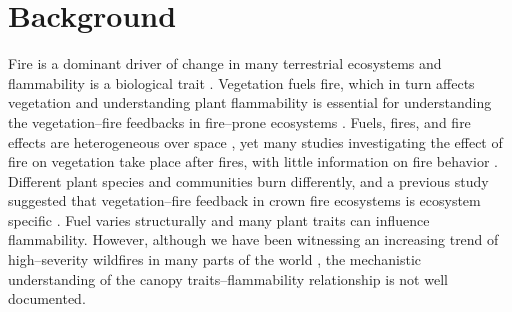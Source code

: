 \documentclass{bmcart}
\begin{document}



\doublespacing

\linenumbers

\section*{Background}
Fire is a dominant driver of change in many terrestrial ecosystems and flammability is a biological trait \citep{pausasandmoi2012flammability}. Vegetation fuels fire, which in turn affects vegetation %
and understanding plant flammability is essential for understanding the vegetation--fire feedbacks in fire--prone ecosystems \citep{ keeley2011fire, pausas2012fire}. Fuels, fires, and fire effects are heterogeneous over space \citep{gagnon2010does, o2018advances}, yet many studies investigating the effect of fire on vegetation take place after fires, with little information on fire behavior \citep{o2018advances}. Different plant species and communities burn differently, and a previous study suggested that vegetation--fire feedback in crown fire ecosystems is ecosystem specific \citep{pausas2004plant}. 
Fuel varies structurally and many plant traits can influence flammability. %
However, although we have been witnessing an increasing trend of high--severity wildfires in many parts of the world \citep{miller2012trends, dennison2014large, weber2020spatiotemporal, salguero2020wildfire}, the mechanistic understanding of the canopy traits--flammability relationship is not well documented.
\end{document}
